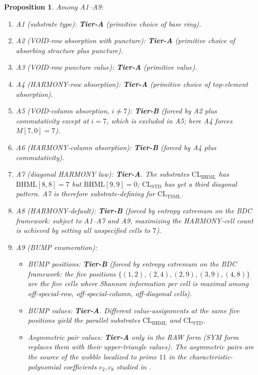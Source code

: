 \documentclass[11pt,reqno]{amsart}
\theoremstyle{plain}
\newtheorem{proposition}[theorem]{Proposition}
\theoremstyle{definition}
\theoremstyle{remark}
\newcommand{\TSML}{\mathrm{TSML}}
\newcommand{\BHML}{\mathrm{BHML}}
\begin{document}
\begin{proposition}\label{prop:tiering}
Among A1--A9:
\begin{enumerate}
\item A1 (substrate type): \textbf{Tier-A} (primitive choice of base ring).
\item A2 (VOID-row absorption with puncture): \textbf{Tier-A}
(primitive choice of absorbing structure plus puncture).
\item A3 (VOID-row puncture value): \textbf{Tier-A} (primitive value).
\item A4 (HARMONY-row absorption): \textbf{Tier-A}
(primitive choice of top-element absorption).
\item A5 (VOID-column absorption, $i\neq 7$): \textbf{Tier-B} (forced
by A2 plus commutativity \emph{except} at $i=7$, which is excluded
in A5; here A4 forces $M[7,0] = 7$).
\item A6 (HARMONY-column absorption): \textbf{Tier-B} (forced by A4
plus commutativity).
\item A7 (diagonal HARMONY law): \textbf{Tier-A}.
The substrates $\mathrm{CL}_\BHML$ has $\BHML[8,8] = 7$ but
$\BHML[9,9] = 0$; $\mathrm{CL}_\mathrm{STD}$ has yet a third diagonal
pattern. A7 is therefore substrate-defining for $\mathrm{CL}_\TSML$.
\item A8 (HARMONY-default): \textbf{Tier-B} (forced by entropy extremum
on the BDC framework: subject to A1--A7 and A9, maximizing the
HARMONY-cell count is achieved by setting all unspecified cells to $7$).
\item A9 (BUMP enumeration):
\begin{itemize}
\item BUMP \emph{positions}: \textbf{Tier-B} (forced by entropy
extremum on the BDC framework: the five positions
$\{(1,2), (2,4), (2,9), (3,9), (4,8)\}$ are the five cells
where Shannon information per cell is maximal among
off-special-row, off-special-column, off-diagonal cells).
\item BUMP \emph{values}: \textbf{Tier-A}. Different value-assignments
at the same five positions yield the parallel substrates
$\mathrm{CL}_\BHML$ and $\mathrm{CL}_\mathrm{STD}$.
\item Asymmetric pair values: \textbf{Tier-A} only in the RAW form
(SYM form replaces them with their upper-triangle values). The
asymmetric pairs are the source of the wobble localized to prime $11$
in the characteristic-polynomial coefficients $c_2, c_8$ studied in
\cite{SandersGishWobble}.
\end{itemize}
\end{enumerate}
\end{proposition}
\end{document}
